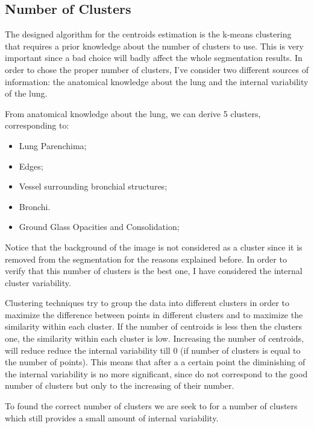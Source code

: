 \documentclass{standalone}
\begin{document}
	\subsection{Number of Clusters}
	
	The designed algorithm for the centroids estimation is the k-means clustering that requires a prior knowledge about the number of clusters to use. This is very important since a bad choice will badly affect the whole segmentation results. In order to chose the proper number of clusters, I've consider two different sources of information: the anatomical knowledge about the lung and the internal variability of the lung.
	
	From anatomical knowledge about the lung, we can derive 5 clusters, corresponding to: 
	
	\begin{itemize}
		\item Lung Parenchima; 
		
		\item  Edges;
		
		\item Vessel surrounding bronchial structures;
		
		
		\item Bronchi.
		
		\item  Ground Glass Opacities and Consolidation;
	\end{itemize}

	Notice that the background of the image is not considered as a cluster since it is removed from the segmentation for the reasons explained before.
	In order to verify that this number of clusters is the best one, I have considered the internal cluster variability.
	
	Clustering techniques try to group the data into different clusters  in order to maximize the difference between points in different clusters and to maximize the similarity within each cluster.  If the number of centroids is less then the clusters one, the similarity within each cluster is low. Increasing the number of centroids, will reduce reduce the internal variability till $0$ (if number of clusters is equal to the number of points). 
	This means that after a a certain point the diminishing of the internal variability is no more significant, since do not correspond to the good number of clusters but only to the increasing of their number.
	
	To found the correct number of clusters we are seek to for a number of clusters which still provides a small amount of internal variability. 
	
\end{document}
